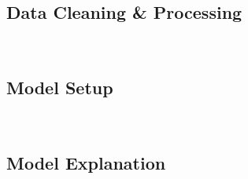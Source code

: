 \subsection{Data Cleaning \& Processing}~\label{subsec:DataClean}
\subsection{Model Setup}~\label{Model Setup}
\subsection{Model Explanation}~\label{Model explain}


